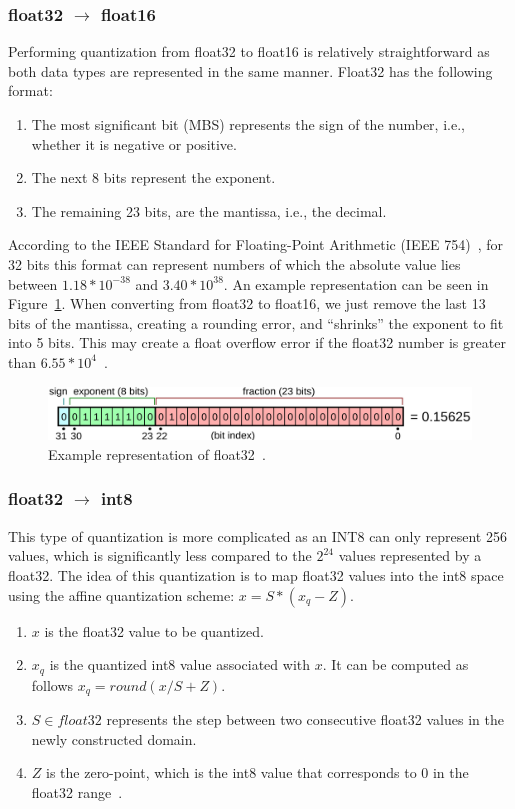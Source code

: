 \documentclass[licencjacka,en]{pracamgr}
\begin{document}
\subsubsection{float32 $\rightarrow$ float16}
Performing quantization from float32 to float16 is relatively straightforward as both data types are represented in the same manner. Float32 has the following format:
\begin{enumerate}
	\item The most significant bit (MBS) represents the sign of the number, i.e., whether it is negative or positive.
	\item The next 8 bits represent the exponent.
	\item The remaining 23 bits, are the mantissa, i.e., the decimal.
\end{enumerate}

According to the IEEE Standard for Floating-Point Arithmetic (IEEE 754)~\cite{IEEE754}, for 32 bits this format can represent numbers of which the absolute value lies between $1.18 * 10^{-38}$ and $3.40 * 10^{38}$. An example representation can be seen in Figure~\ref{fig:float}.
When converting from float32 to float16, we just remove the last 13 bits of the mantissa, creating a rounding error, and “shrinks” the exponent to fit into 5 bits. This may create a float overflow error if the float32 number is greater than $ 6.55 * 10^4$~\cite{quant_explained}.

\begin{figure}
    \centering
    \includegraphics[width=1.0\linewidth]{bachelor_images/mantis.png}
    \caption{Example representation of float32~\cite{IEEE754}.}
    \label{fig:float}
\end{figure}

\subsubsection{float32 $\rightarrow$ int8}
This type of quantization is more complicated as an INT8 can only represent 256 values, which is significantly less compared to the $ 2^{24} $  values represented by a float32. The idea of this quantization is to map float32 values into the int8 space using the affine quantization scheme: $ x = S * (x_q - Z) $.
\begin{enumerate}
	\item $ x $ is the float32 value to be quantized.
	\item  $ x_q $ is the quantized int8 value associated with $ x $. It can be computed as follows $ x_q = round(x/S + Z) $.
	\item $ S \in float32$ represents the step between two consecutive float32 values in the newly constructed domain.
	\item $ Z $ is the zero-point, which is the int8 value that corresponds to 0 in the float32 range~\cite{quant_hf}.
\end{enumerate}
\end{document}
